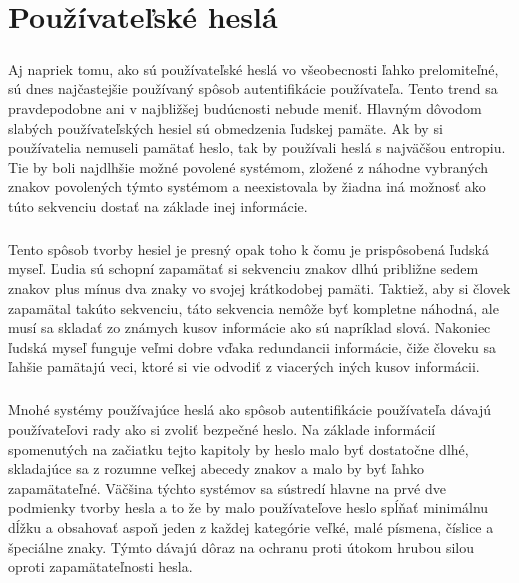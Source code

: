 \chapter{Používateľské heslá}

\paragraph{}
Aj napriek tomu, ako sú používateľské heslá vo všeobecnosti ľahko prelomiteľné, sú dnes najčastejšie používaný spôsob autentifikácie používateľa. Tento trend sa pravdepodobne ani v najbližšej budúcnosti nebude meniť. Hlavným dôvodom slabých používateľských hesiel sú obmedzenia ľudskej pamäte. Ak by si používatelia nemuseli pamätať heslo, tak by používali heslá s najväčšou entropiu. Tie by boli najdlhšie možné povolené systémom, zložené z náhodne vybraných znakov povolených týmto systémom a neexistovala by žiadna iná možnosť ako túto sekvenciu dostať na základe inej informácie.

\paragraph{}
Tento spôsob tvorby hesiel je presný opak toho k čomu je prispôsobená ľudská myseľ. Ľudia sú schopní zapamätať si sekvenciu znakov dlhú približne sedem znakov plus mínus dva znaky vo svojej krátkodobej pamäti. Taktiež, aby si človek zapamätal takúto sekvenciu, táto sekvencia nemôže byť kompletne náhodná, ale musí sa skladať zo známych kusov informácie ako sú napríklad slová. Nakoniec ľudská myseľ funguje veľmi dobre vďaka redundancii informácie, čiže človeku sa ľahšie pamätajú veci, ktoré si vie odvodiť z viacerých iných kusov informácii.

\paragraph{}
Mnohé systémy používajúce heslá ako spôsob autentifikácie používateľa dávajú používateľovi rady ako si zvoliť bezpečné heslo. Na základe informácií spomenutých na začiatku tejto kapitoly by heslo malo byť dostatočne dlhé, skladajúce sa z rozumne veľkej abecedy znakov a malo by byť ľahko zapamätateľné. Väčšina týchto systémov sa sústredí hlavne na prvé dve podmienky tvorby hesla a to že by malo používateľove heslo spĺňať minimálnu dĺžku a obsahovať aspoň jeden z každej kategórie veľké, malé písmena, číslice a špeciálne znaky. Týmto dávajú dôraz na ochranu proti útokom hrubou silou oproti zapamätateľnosti hesla.

